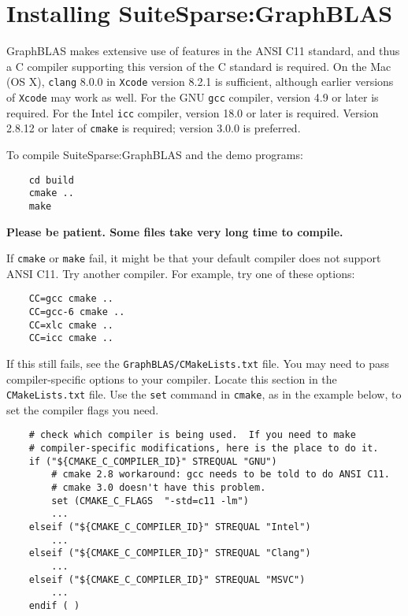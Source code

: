 \documentclass[12pt]{article}
\begin{document}
\newpage
\section{Installing SuiteSparse:GraphBLAS}

GraphBLAS makes extensive use of features in the ANSI C11 standard, and thus a
C compiler supporting this version of the C standard is required.  On the Mac
(OS X), \verb'clang' 8.0.0 in \verb'Xcode' version 8.2.1 is sufficient,
although earlier versions of \verb'Xcode' may work as well.  For the GNU
\verb'gcc' compiler, version 4.9 or later is required.  For the Intel
\verb'icc' compiler, version 18.0 or later is required.  Version 2.8.12 or
later of \verb'cmake' is required; version 3.0.0 is preferred.

To compile SuiteSparse:GraphBLAS and the demo programs:

    {\small
    \begin{verbatim}
    cd build
    cmake ..
    make \end{verbatim} }

{\bf Please be patient.  Some files take very long time to compile.}

If \verb'cmake' or \verb'make' fail, it might be that your default compiler
does not support ANSI C11.  Try another compiler.  For example, try one of
these options:

    {\small
    \begin{verbatim}
    CC=gcc cmake ..
    CC=gcc-6 cmake ..
    CC=xlc cmake ..
    CC=icc cmake ..  \end{verbatim} }

If this still fails, see the \verb'GraphBLAS/CMakeLists.txt' file.  You may
need to pass compiler-specific options to your compiler.  Locate this section
in the \verb'CMakeLists.txt' file.  Use the \verb'set' command in \verb'cmake',
as in the example below, to set the compiler flags you need.

    {\small
    \begin{verbatim}
    # check which compiler is being used.  If you need to make
    # compiler-specific modifications, here is the place to do it.
    if ("${CMAKE_C_COMPILER_ID}" STREQUAL "GNU")
        # cmake 2.8 workaround: gcc needs to be told to do ANSI C11.
        # cmake 3.0 doesn't have this problem.
        set (CMAKE_C_FLAGS  "-std=c11 -lm")
        ...
    elseif ("${CMAKE_C_COMPILER_ID}" STREQUAL "Intel")
        ...
    elseif ("${CMAKE_C_COMPILER_ID}" STREQUAL "Clang")
        ...
    elseif ("${CMAKE_C_COMPILER_ID}" STREQUAL "MSVC")
        ...
    endif ( )
    \end{verbatim} }
\end{document}

